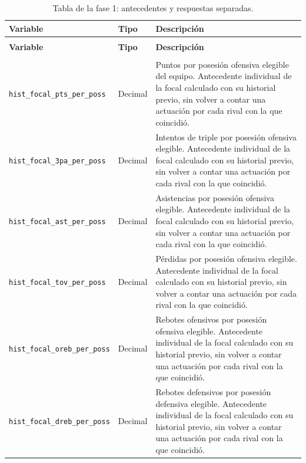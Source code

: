 \begingroup
\small
{}
\setlength{\tabcolsep}{4pt}
\renewcommand{\arraystretch}{1.15}
\begin{longtable}{@{}>{\raggedright\arraybackslash}p{5.0cm}>{\raggedright\arraybackslash}p{1.9cm}>{\raggedright\arraybackslash}p{7.7cm}@{}}
\caption{Tabla de la fase 1: antecedentes y respuestas separadas.}\label{tab:entrada_fase1_historial}\\
\toprule\textbf{Variable}&\textbf{Tipo}&\textbf{Descripción}\\\midrule\endfirsthead
\multicolumn{3}{l}{\small Continuación de la Tabla~\ref{tab:entrada_fase1_historial}}\\
\toprule\textbf{Variable}&\textbf{Tipo}&\textbf{Descripción}\\\midrule\endhead
\midrule\multicolumn{3}{r}{\small Continúa en la siguiente página}\\\endfoot
\bottomrule\endlastfoot
\texttt{hist\_\allowbreak focal\_\allowbreak pts\_\allowbreak per\_\allowbreak poss} & Decimal & Puntos por posesión ofensiva elegible del equipo. Antecedente individual de la focal calculado con su historial previo, sin volver a contar una actuación por cada rival con la que coincidió.\\
\texttt{hist\_\allowbreak focal\_\allowbreak 3pa\_\allowbreak per\_\allowbreak poss} & Decimal & Intentos de triple por posesión ofensiva elegible. Antecedente individual de la focal calculado con su historial previo, sin volver a contar una actuación por cada rival con la que coincidió.\\
\texttt{hist\_\allowbreak focal\_\allowbreak ast\_\allowbreak per\_\allowbreak poss} & Decimal & Asistencias por posesión ofensiva elegible. Antecedente individual de la focal calculado con su historial previo, sin volver a contar una actuación por cada rival con la que coincidió.\\
\texttt{hist\_\allowbreak focal\_\allowbreak tov\_\allowbreak per\_\allowbreak poss} & Decimal & Pérdidas por posesión ofensiva elegible. Antecedente individual de la focal calculado con su historial previo, sin volver a contar una actuación por cada rival con la que coincidió.\\
\texttt{hist\_\allowbreak focal\_\allowbreak oreb\_\allowbreak per\_\allowbreak poss} & Decimal & Rebotes ofensivos por posesión ofensiva elegible. Antecedente individual de la focal calculado con su historial previo, sin volver a contar una actuación por cada rival con la que coincidió.\\
\texttt{hist\_\allowbreak focal\_\allowbreak dreb\_\allowbreak per\_\allowbreak poss} & Decimal & Rebotes defensivos por posesión defensiva elegible. Antecedente individual de la focal calculado con su historial previo, sin volver a contar una actuación por cada rival con la que coincidió.\\

\end{longtable}
